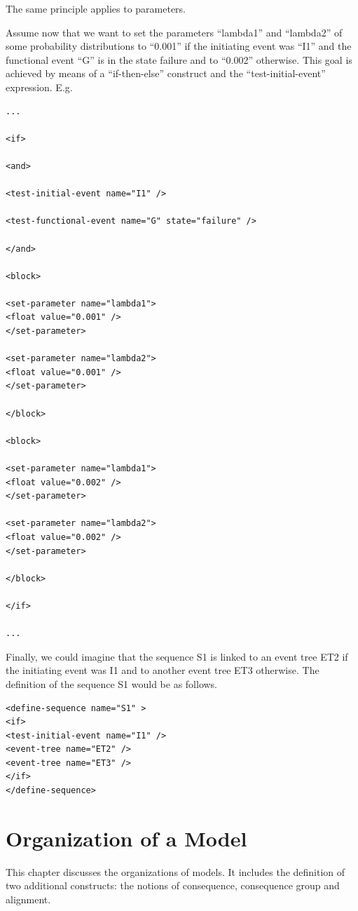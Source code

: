 \documentclass[11pt]{article}
\begin{document}
The same principle applies to parameters.

Assume now that we want to set the parameters ``lambda1'' and ``lambda2'' of
some probability distributions to ``0.001'' if the initiating event was
``I1'' and the functional event ``G'' is in the state failure and to ``0.002''
otherwise. This goal is achieved by means of a ``if-then-else'' construct
and the ``test-initial-event'' expression. E.g.
\lstset{language=[LaTeX]TeX,label= ,caption= ,captionpos=b,numbers=none}
\begin{lstlisting}
...

<if>

<and>

<test-initial-event name="I1" />

<test-functional-event name="G" state="failure" />

</and>

<block>

<set-parameter name="lambda1"> 
<float value="0.001" /> 
</set-parameter>

<set-parameter name="lambda2"> 
<float value="0.001" /> 
</set-parameter>

</block>

<block>

<set-parameter name="lambda1"> 
<float value="0.002" /> 
</set-parameter>

<set-parameter name="lambda2"> 
<float value="0.002" /> 
</set-parameter>

</block>

</if>

...
\end{lstlisting}

Finally, we could imagine that the sequence S1 is linked to an event
tree ET2 if the initiating event was I1 and to another event tree ET3
otherwise. The definition of the sequence S1 would be as follows.

\lstset{language=XML,label= ,caption= ,captionpos=b,numbers=none}
\begin{lstlisting}
<define-sequence name="S1" >
<if>
<test-initial-event name="I1" />
<event-tree name="ET2" />
<event-tree name="ET3" />
</if>
</define-sequence>
\end{lstlisting}

\section{Organization of a Model}
\label{sec:org5f86af7}

This chapter discusses the organizations of models. It includes the
definition of two additional constructs: the notions of consequence,
consequence group and alignment.
\end{document}
